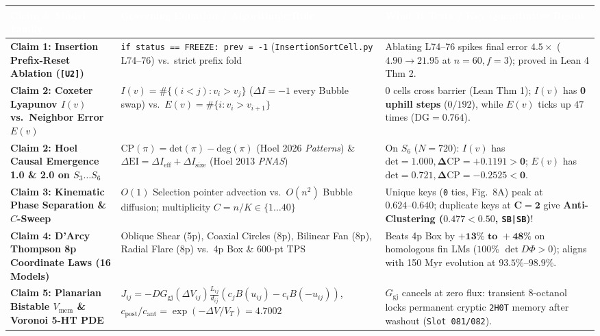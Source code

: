 \documentclass[10pt,a4paper]{article}
\begin{document}
\begin{table}[h!]
\centering
\renewcommand{\arraystretch}{1.04}
\scriptsize
\begin{tabular}{@{}p{}p{}p{}@{}}
\toprule
\rowcolor{navybg}
\textcolor{white}{\textbf{Claim \& Model Family}} & \textcolor{white}{\textbf{Governing Equation / Algorithmic Rule}} & \textcolor{white}{\textbf{What It Tests / Key Quantitative Result}} \\
\midrule
\rowcolor{softgray}
\textbf{Claim 1: Insertion Prefix-Reset Ablation (\texttt{[U2]})} & \texttt{if status == FREEZE: prev = -1} (\texttt{InsertionSortCell.py} L74--76) vs.\ strict prefix fold & Ablating L74--76 spikes final error $\mathbf{4.5\times}$ ($\mathbf{4.90 \to 21.95}$ at $n=60, f=3$); proved in Lean 4 Thm 2. \\
\textbf{Claim 2: Coxeter Lyapunov $I(v)$ vs.\ Neighbor Error $E(v)$} & $I(v) = \#\{(i<j): v_i > v_j\}$ ($\Delta I = -1$ every Bubble swap) vs.\ $E(v) = \#\{i: v_i > v_{i+1}\}$ & $0$ cells cross barrier (Lean Thm 1); $I(v)$ has \textbf{0 uphill steps} ($0/192$), while $E(v)$ ticks up $47$ times ($\mathrm{DG}=0.764$). \\
\rowcolor{softgray}
\textbf{Claim 2: Hoel Causal Emergence 1.0 \& 2.0 on $S_3 \dots S_6$} & $\mathrm{CP}(\pi) = \mathrm{det}(\pi) - \mathrm{deg}(\pi)$ (Hoel 2026 \emph{Patterns}) \& $\Delta\mathrm{EI} = \Delta I_{\mathrm{eff}} + \Delta I_{\mathrm{size}}$ (Hoel 2013 \emph{PNAS}) & On $S_6$ ($N=720$): $I(v)$ has $\mathrm{det}=1.000, \mathbf{\Delta\mathrm{CP}=+0.1191>0}$; $E(v)$ has $\mathrm{det}=0.721, \mathbf{\Delta\mathrm{CP}=-0.2525<0}$. \\
\textbf{Claim 3: Kinematic Phase Separation \& $C$-Sweep} & $O(1)$ Selection pointer advection vs.\ $O(n^2)$ Bubble diffusion; multiplicity $C = n/K \in \{1 \dots 40\}$ & Unique keys (\texttt{0} ties, Fig.\ 8A) peak at $\mathbf{0.624\text{--}0.640}$; duplicate keys at $\mathbf{C=2}$ give \textbf{Anti-Clustering ($\mathbf{0.477 < 0.50}$, \texttt{SB|SB})}! \\
\rowcolor{softgray}
\textbf{Claim 4: D'Arcy Thompson 8p Coordinate Laws (16 Models)} & Oblique Shear (5p), Coaxial Circles (8p), Bilinear Fan (8p), Radial Flare (8p) vs.\ 4p Box \& 600-pt TPS & Beats 4p Box by $\mathbf{+13\%\text{ to }+48\%}$ on homologous fin LMs ($100\%$ $\det D\Phi > 0$); aligns with 150 Myr evolution at $\mathbf{93.5\%\text{--}98.9\%}$. \\
\textbf{Claim 5: Planarian Bistable $V_{\mathrm{mem}}$ \& Voronoi 5-HT PDE} & $J_{ij} = -D G_{\mathrm{gj}}(\Delta V_{ij})\frac{L_{ij}}{d_{ij}}(c_j B(u_{ij}) - c_i B(-u_{ij}))$, $c_{\mathrm{post}}/c_{\mathrm{ant}} = \exp(-\Delta V / V_T) = 4.7002$ & $G_{\mathrm{gj}}$ cancels at zero flux: transient 8-octanol locks permanent cryptic \texttt{2H0T} memory after washout (\texttt{Slot 081/082}). \\

\end{tabular}
\end{table}
\end{document}
